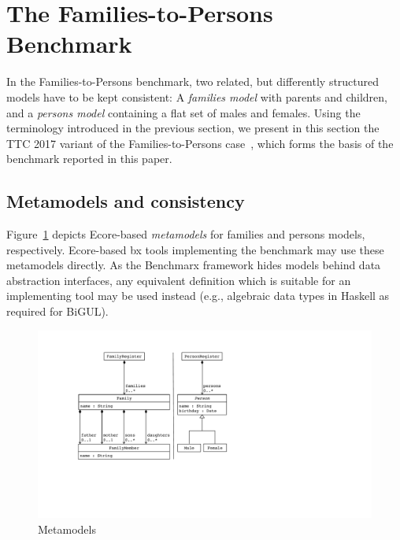 

\section{The Families-to-Persons Benchmark}
\label{sec:FamiliesToPersons}

In the Families-to-Persons benchmark, two related, but differently structured models have to be kept consistent: A \emph{families model} with parents and children, and a \emph{persons model} containing a flat set of males and females. 
Using the terminology introduced in the previous section, we present in this section the TTC 2017 variant of the Families-to-Persons case~\cite{Anjorin2017a,ENASE2018-Westfechtel}, which forms the basis of the benchmark reported in this paper. 

\subsection{Metamodels and consistency}
\label{sec:MetamodelsAndConsistency}

Figure~\ref{fig:metamodels} depicts Ecore-based \emph{metamodels} for families and persons models, respectively.
Ecore-based bx tools implementing the benchmark may use these metamodels directly.
As the Benchmarx framework hides models behind data abstraction interfaces, any equivalent definition which is suitable for an implementing tool may be used instead (e.g., algebraic data types in Haskell as required for BiGUL).

\begin{figure}[tb!]
	\centering
	\includegraphics[width=\columnwidth]{diagrams/f2p-case/Metamodels}
	\caption{Metamodels}
	\label{fig:metamodels}
\end{figure}

